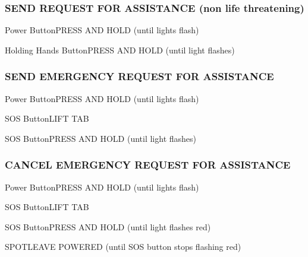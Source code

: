 \begin{multicols}{2}
\subsubsection*{SEND REQUEST FOR ASSISTANCE (non life threatening)}
\begin{enumerate*}
\item Power Button\dotfill PRESS AND HOLD (until lights flash)
\item Holding Hands Button\dotfill PRESS AND HOLD (until light flashes)
\end{enumerate*}

\subsubsection*{SEND EMERGENCY REQUEST FOR ASSISTANCE}
\begin{enumerate*}
\item Power Button\dotfill PRESS AND HOLD (until lights flash)
\item SOS Button\dotfill LIFT TAB
\item SOS Button\dotfill PRESS AND HOLD (until light flashes)
\end{enumerate*}

\subsubsection*{CANCEL EMERGENCY REQUEST FOR ASSISTANCE}
\begin{enumerate*}
\item Power Button\dotfill PRESS AND HOLD (until lights flash)
\item SOS Button\dotfill LIFT TAB
\item SOS Button\dotfill PRESS AND HOLD (until light flashes red)
\item SPOT\dotfill LEAVE POWERED (until SOS button stops flashing red)
\end{enumerate*}

\end{multicols}

\cleardoublepage
\ohead{\leftmark} %
\chead{} %
